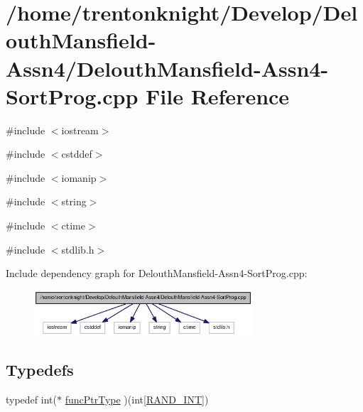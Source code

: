 \hypertarget{_delouth_mansfield-_assn4-_sort_prog_8cpp}{
\section{/home/trentonknight/Develop/DelouthMansfield-\/Assn4/DelouthMansfield-\/Assn4-\/SortProg.cpp File Reference}
\label{_delouth_mansfield-_assn4-_sort_prog_8cpp}
}
{\ttfamily \#include $<$iostream$>$}\par
{\ttfamily \#include $<$cstddef$>$}\par
{\ttfamily \#include $<$iomanip$>$}\par
{\ttfamily \#include $<$string$>$}\par
{\ttfamily \#include $<$ctime$>$}\par
{\ttfamily \#include $<$stdlib.h$>$}\par
Include dependency graph for DelouthMansfield-\/Assn4-\/SortProg.cpp:\nopagebreak
\begin{figure}[H]
\begin{center}
\leavevmode
\includegraphics[width=230pt]{_delouth_mansfield-_assn4-_sort_prog_8cpp__incl}
\end{center}
\end{figure}
\subsection*{Typedefs}
\begin{DoxyCompactItemize}
\item 
typedef int($\ast$ \hyperlink{_delouth_mansfield-_assn4-_sort_prog_8cpp_ae2987d0004dea58df8c833858c0fb370}{funcPtrType} )(int\mbox{[}\hyperlink{_delouth_mansfield-_assn4-_sort_prog_8cpp_a134c2ba56ae9ba89c77a5c0dba9f2124}{RAND\_\-INT}\mbox{]})
\end{DoxyCompactItemize}
